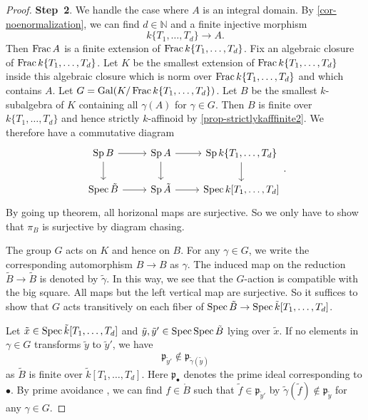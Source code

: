 \begin{proof}
    \textbf{Step~2}. We handle the case where $A$ is an integral domain. By \cref{cor-noenormalization}, we can find $d\in \mathbb{N}$ and  a finite injective morphism
    \[
        k\{T_1,\ldots,T_d\}\rightarrow A.  
    \]
    Then $\operatorname{Frac} A$ is a finite extension of $\operatorname{Frac} k\{T_1,\ldots,T_d\}$. Fix an algebraic closure of $\operatorname{Frac} k\{T_1,\ldots,T_d\}$.
    Let $K$ be the smallest extension of $\operatorname{Frac} k\{T_1,\ldots,T_d\}$ inside this algebraic closure which is norm over $\operatorname{Frac} k\{T_1,\ldots,T_d\}$ and which contains $A$. Let $G=\operatorname{Gal}(K/\operatorname{Frac} k\{T_1,\ldots,T_d\})$. Let $B$ be the smallest $k$-subalgebra of $K$ containing all $\gamma(A)$ for $\gamma\in G$. Then $B$ is finite over $k\{T_1,\ldots,T_d\}$ and hence strictly $k$-affinoid by \cref{prop-strictlykafffinite2}.
    We therefore have a commutative diagram
    \[
        \begin{tikzcd}
            \Sp B \arrow[r] \arrow[d] & \Sp A \arrow[r] \arrow[d] & {\Sp k\{T_1,\ldots,T_d\}} \arrow[d] \\
            \Spec \tilde{B} \arrow[r] & \Sp \tilde{A} \arrow[r]   & {\Spec k[T_1,\ldots,T_d]}          
        \end{tikzcd}.  
    \]
    By going up theorem, all horizonal maps are surjective. So we only have to show that $\pi_B$ is surjective by diagram chasing.

    The group $G$ acts on $K$ and hence on $B$. For any $\gamma\in G$, we write the corresponding automorphism $B\rightarrow B$ as $\gamma$. The induced map on the reduction $\tilde{B}\rightarrow \tilde{B}$ is denoted by $\tilde{\gamma}$. In this way, we see that the $G$-action is compatible with the big square. All maps but the left vertical map are surjective. So it suffices to show that $G$ acts transitively on each fiber of $\operatorname{Spec} \tilde{B}\rightarrow \operatorname{Spec} \tilde{k}[T_1,\ldots,T_d]$.

    
    Let $\tilde{x}\in \operatorname{Spec} \tilde{k}[T_1,\ldots,T_d]$ and $\tilde{y},\tilde{y}'\in \operatorname{Spec} \operatorname{Spec} \tilde{B}$ lying over $\tilde{x}$. If no elements in $\gamma\in G$ transforms $\tilde{y}$ to $\tilde{y}'$, we have 
    \[
        \mathfrak{p}_{\tilde{y}'}\not\in \mathfrak{p}_{\tilde{\gamma}(\tilde{y})}  
    \]
    as $\tilde{B}$ is finite over $\tilde{k}[T_1,\ldots,T_d]$. Here $\mathfrak{p}_{\bullet}$ denotes the prime ideal corresponding to $\bullet$. By prime avoidance \cite[\href{https://stacks.math.columbia.edu/tag/00DS}{Tag 00DS}]{stacks-project}, we can find $f\in \mathring{B}$ such that $\tilde{f}\in \mathfrak{p}_{\tilde{y}'}$ by $\tilde{\gamma}(\tilde{f})\not\in \mathfrak{p}_{\tilde{y}}$ for any $\gamma\in G$.


\end{proof}
